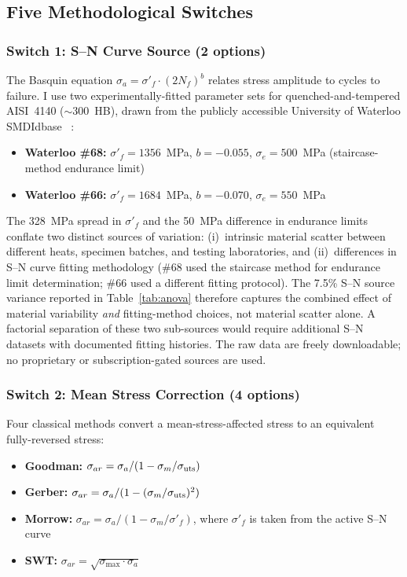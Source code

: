 \documentclass[12pt,a4paper]{article}
\begin{document}
\subsection{Five Methodological Switches}

\subsubsection{Switch 1: S--N Curve Source (2 options)}

The Basquin equation $\sigma_a = \sigma'_f \cdot (2N_f)^b$ relates
stress amplitude to cycles to failure. I use two experimentally-fitted
parameter sets for quenched-and-tempered AISI~4140 ($\sim$300~HB),
drawn from the publicly accessible University of Waterloo SMDIdbase%
~\cite{waterloo_fde}:

\begin{itemize}
  \item \textbf{Waterloo \#68:} $\sigma'_f = 1356$~MPa, $b=-0.055$,
        $\sigma_e=500$~MPa (staircase-method endurance limit)
  \item \textbf{Waterloo \#66:} $\sigma'_f = 1684$~MPa, $b=-0.070$,
        $\sigma_e=550$~MPa
\end{itemize}

The 328~MPa spread in $\sigma'_f$ and the 50~MPa difference in endurance
limits conflate two distinct sources of variation: (i)~intrinsic
material scatter between different heats, specimen batches, and testing
laboratories, and (ii)~differences in S--N curve fitting methodology
(\#68 used the staircase method for endurance limit determination;
\#66 used a different fitting protocol). The 7.5\% S--N source variance
reported in Table~\ref{tab:anova} therefore captures the combined
effect of material variability \emph{and} fitting-method choices, not
material scatter alone. A factorial separation of these two sub-sources
would require additional S--N datasets with documented fitting
histories. The raw data are freely downloadable; no proprietary or
subscription-gated sources are used.

\subsubsection{Switch 2: Mean Stress Correction (4 options)}

Four classical methods convert a mean-stress-affected stress to an
equivalent fully-reversed stress:

\begin{itemize}
  \item \textbf{Goodman:}
        $\sigma_{ar} = \sigma_a / (1 - \sigma_m/\sigma_{\rm uts})$
  \item \textbf{Gerber:}
        $\sigma_{ar} = \sigma_a / (1 - (\sigma_m/\sigma_{\rm uts})^2)$
  \item \textbf{Morrow:}
        $\sigma_{ar} = \sigma_a / (1 - \sigma_m/\sigma'_f)$,
        where $\sigma'_f$ is taken from the active S--N curve
  \item \textbf{SWT:}
        $\sigma_{ar} = \sqrt{\sigma_{\max} \cdot \sigma_a}$
\end{itemize}
\end{document}
